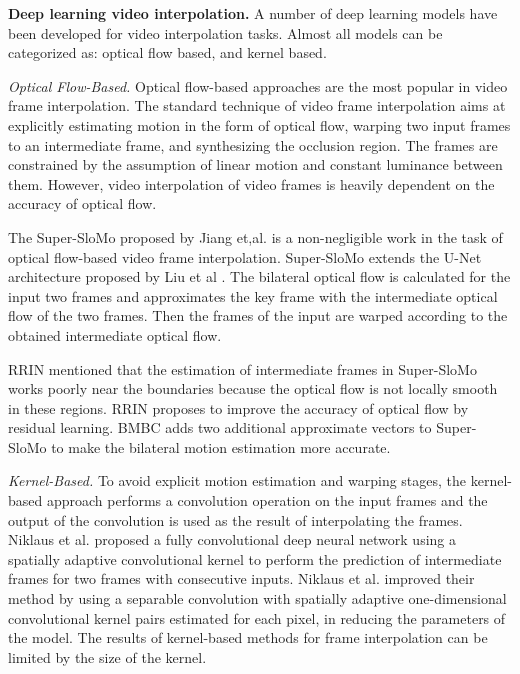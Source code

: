 \documentclass{article}
\begin{document}
\textbf{Deep learning video interpolation.}
A number of deep learning models have been developed for video interpolation tasks.
Almost all models can be categorized as: optical flow based, and kernel based.

\textit{Optical Flow-Based.}
Optical flow-based approaches are the most popular in video frame interpolation.
The standard technique of video frame interpolation aims at explicitly estimating motion in the form of optical flow, warping two input frames to an intermediate frame, and synthesizing the occlusion region. The frames are constrained by the assumption of linear motion and constant luminance between them.
However, video interpolation of video frames is heavily dependent on the accuracy of optical flow.

The Super-SloMo \cite{jiang2018super} proposed by Jiang et,al. is a non-negligible work in the task of optical flow-based video frame interpolation.
Super-SloMo extends the U-Net architecture proposed by Liu et al \cite{liu2017video}.
The bilateral optical flow is calculated for the input two frames and approximates the key frame with the intermediate optical flow of the two frames.
Then the frames of the input are warped according to the obtained intermediate optical flow.

RRIN \cite{li2020video} mentioned that the estimation of intermediate frames in Super-SloMo works poorly near the boundaries because the optical flow is not locally smooth in these regions.
RRIN proposes to improve the accuracy of optical flow by residual learning.
BMBC \cite{park2020bmbc} adds two additional approximate vectors to Super-SloMo to make the bilateral motion estimation more accurate.


\textit{Kernel-Based.}
To avoid explicit motion estimation and warping stages, the kernel-based approach performs a convolution operation on the input frames and the output of the convolution is used as the result of interpolating the frames.
Niklaus et al. \cite{niklaus2017video1} proposed a fully convolutional deep neural network using a spatially adaptive convolutional kernel to perform the prediction of intermediate frames for two frames with consecutive inputs.
Niklaus et al. \cite{niklaus2017video2} improved their method by using a separable convolution with spatially adaptive one-dimensional convolutional kernel pairs estimated for each pixel, in reducing the parameters of the model.
The results of kernel-based methods for frame interpolation can be limited by the size of the kernel.
\end{document}
